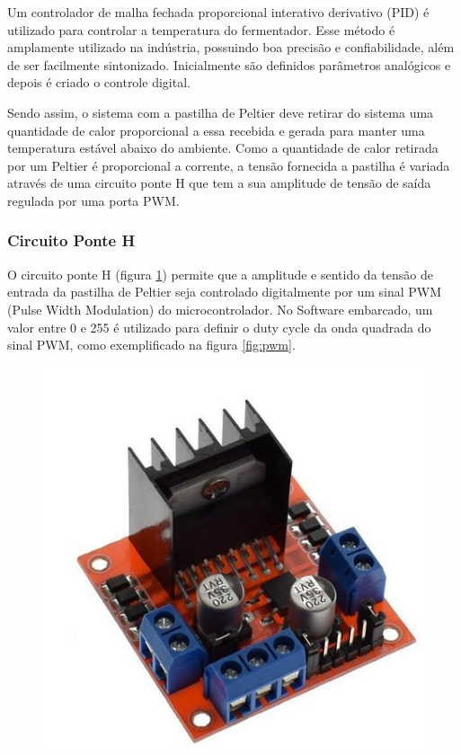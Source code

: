 Um controlador de malha fechada proporcional interativo derivativo (PID) é utilizado para controlar a temperatura do fermentador. Esse método é amplamente utilizado na indústria, possuindo boa precisão e confiabilidade, além de ser facilmente sintonizado. Inicialmente são definidos parâmetros analógicos e depois é criado o controle digital.


Sendo assim, o sistema com a pastilha de Peltier deve retirar do sistema uma quantidade de calor proporcional a essa recebida e gerada para manter uma temperatura estável abaixo do ambiente. Como a quantidade de calor retirada por um Peltier é proporcional a corrente, a tensão fornecida a pastilha é variada através de uma circuito ponte H que tem a sua amplitude de tensão de saída regulada por uma porta PWM.  

\subsubsection{Circuito Ponte H}

O circuito ponte H (figura \ref{fig:ponte_h}) permite que a amplitude e sentido da tensão de entrada da pastilha de Peltier seja controlado digitalmente por um sinal PWM (Pulse Width Modulation) do microcontrolador. No Software embarcado, um valor entre 0 e 255 é utilizado para definir o duty cycle da onda quadrada do sinal PWM, como exemplificado na figura \ref{fig:pwm}. 


\begin{figure}[H]
    \centering
    \includegraphics[scale=0.35]{figuras/implementacao/hardware/ponte_h.jpg}
    \label{fig:ponte_h}
\end{figure}

